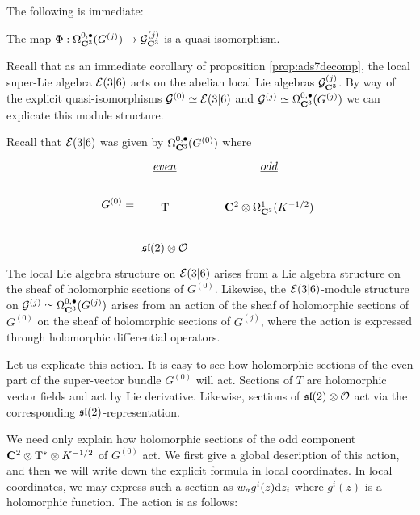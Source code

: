 \documentclass[../main.tex]{subfiles}
\begin{document}
The following is immediate:

\begin{lem}\label{lem:qisG}
The map $\Phi: \Omega^{0,\bullet}_{\mathbf{C}^3} (G^{(j)} ) \to \mathcal{G}^{(j)}_{\mathbf{C}^3}$ is a quasi-isomorphism.
\end{lem}


\parsec[]
Recall that as an immediate corollary of proposition \ref{prop:ads7decomp}, the local super-Lie algebra $\mathcal{E}(3|6)$ acts on the abelian local Lie algebras $\mathcal{G}^{(j)} _{\mathbf{C}^3}$. By way of the explicit quasi-isomorphisms  $\mathcal{G}^{(0)} \simeq \mathcal{E}(3|6)$ and $\mathcal{G}^{(j)} \simeq \Omega^{0,\bullet}_{\mathbf{C}^3}( G^{(j)})$ we can explicate this module structure.

Recall that $\mathcal{E}(3|6)$ was given by  $\Omega^{0,\bullet}_{\mathbf{C}^3} (G^{(0)})$ where 
\begin{equation}
G^{(0)} = 
\begin{tikzcd}
\ul{even} & \ul{odd} \\
\T & \C^2\otimes \Omega^1_{\C^3} (K^{-1/2}) \\
\mf {sl}(2)\otimes \mc O
\end{tikzcd}
\end{equation}
The local Lie algebra structure on $\mathcal{E}(3|6)$ arises from a Lie algebra structure on the sheaf of holomorphic sections of $G^{(0)}$. Likewise, the $\mathcal{E}(3|6)$-module structure on $\mathcal{G}^{(j)} \simeq \Omega^{0,\bullet}_{\mathbf{C}^3} (G^{(j)})$ arises from an action of the sheaf of holomorphic sections of $G^{(0)}$ on the sheaf of holomorphic sections of $G^{(j)}$, where the action is expressed through holomorphic differential operators.

Let us explicate this action. It is easy to see how holomorphic sections of the even part of the super-vector bundle $G^{(0)}$ will act. Sections of $T$ are holomorphic vector fields and act by Lie derivative. Likewise, sections of $\mathfrak{sl}(2) \otimes \mathcal{O}$ act via the corresponding $\mathfrak{sl}(2)$-representation.

We need only explain how holomorphic sections of the odd component $\mathbf{C}^2 \otimes {\mathrm{T}}^* \otimes K^{-1/2}$ of $G^{(0)}$ act. We first give a global description of this action, and then we will write down the explicit formula in local coordinates. In local coordinates, we may express such a section as  $w_a g^i(z) \mathrm{d} z_i$ where $g^i(z)$ is a holomorphic function. The action is as follows:
 
\end{document}
